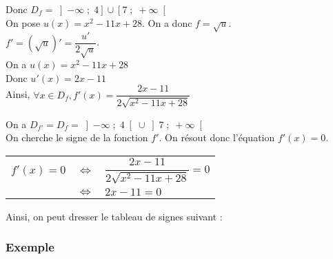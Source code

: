 \vspace*{.3cm}

Donc $D_f = \left]-\infty\; ; \; 4\right]\cup \left[7 \; ; \; +\infty\right[$ \\

On pose $u(x) = x^2 - 11x + 28$. On a donc $f = \sqrt{u}$. \\

$f' = \left(\sqrt{u}\right)' = \dfrac{u'}{2\sqrt{u}}$. \\

On a $u(x) = x^2 - 11x + 28$ \\
Donc $u'(x) = 2x - 11$ \\

Ainsi, $\forall x \in D_f, f'(x) = \dfrac{2x - 11}{2\sqrt{x^2 -11x + 28}}$ \\

\vspace*{.3cm} 

On a $D_{f'} = D_f = \left]-\infty\; ; \; 4\right[\cup \left]7 \; ; \; +\infty\right[$ \\

On cherche le signe de la fonction $f'$. On résout donc l'équation $f'(x) = 0$. \\

\begin{tabular}{rll}
$f'(x) = 0$ & $\Longleftrightarrow$ & $\dfrac{2x - 11}{2\sqrt{x^2 -11x + 28}} = 0$ \vspace*{.3cm} \\
& $\Longleftrightarrow$ & $2x - 11 = 0$ \\
\end{tabular}

\vspace*{.3cm}

Ainsi, on peut dresser le tableau de signes suivant :  \\


\newpage

\subsubsection{Exemple }


